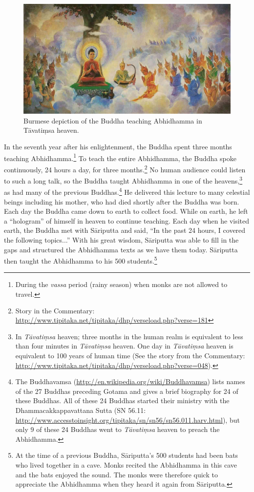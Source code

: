 \begin{figure}[H]
\centering
\includegraphics[width=1.0\linewidth]{./Diagrams/Tavatimsa}
\caption{Burmese depiction of the Buddha teaching Abhidhamma in Tāvatiṃsa heaven.}
\label{fig:Tavatimsa}
\end{figure}

In the seventh year after his enlightenment, the Buddha spent three months teaching Abhidhamma.\footnote{During the \textit{vassa} period (rainy season) when monks are not allowed to travel.} To teach the entire Abhidhamma, the Buddha spoke continuously, 24 hours a day, for three months.\footnote{Story in the Commentary: \url{http://www.tipitaka.net/tipitaka/dhp/verseload.php?verse=181}} No human audience could listen to such a long talk, so the Buddha taught Abhidhamma in one of the heavens,\footnote{In \textit{Tāvatiṃsa} heaven; three months in the human realm is equivalent to less than four minutes in \textit{Tāvatiṃsa} heaven. One day in \textit{Tāvatiṃsa} heaven is equivalent to 100 years of human time (See the story from the Commentary: \url{http://www.tipitaka.net/tipitaka/dhp/verseload.php?verse=048}).} as had many of the previous Buddhas.\footnote{The Buddhavamsa (\url{http://en.wikipedia.org/wiki/Buddhavamsa}) lists names of the 27 Buddhas preceding Gotama and gives a brief biography for 24 of these Buddhas. All of these 24 Buddhas started their ministry with the Dhammacakkappavattana Sutta (SN 56.11: \url{http://www.accesstoinsight.org/tipitaka/sn/sn56/sn56.011.harv.html}), but only 9 of these 24 Buddhas went to \textit{Tāvatiṃsa} heaven to preach the Abhidhamma.} He delivered this lecture to many celestial beings including his mother, who had died shortly after the Buddha was born. Each day the Buddha came down to earth to collect food. While on earth, he left a “hologram” of himself in heaven to continue teaching. Each day when he visited earth, the Buddha met with Sāriputta and said, “In the past 24 hours, I covered the following topics...” With his great wisdom, Sāriputta was able to fill in the gaps and structured the Abhidhamma texts as we have them today. Sāriputta then taught the Abhidhamma to his 500 students.\footnote{At the time of a previous Buddha, Sāriputta’s 500 students had been bats who lived together in a cave. Monks recited the Abhidhamma in this cave and the bats enjoyed the sound. The monks were therefore quick to appreciate the Abhidhamma when they heard it again from Sāriputta.}

